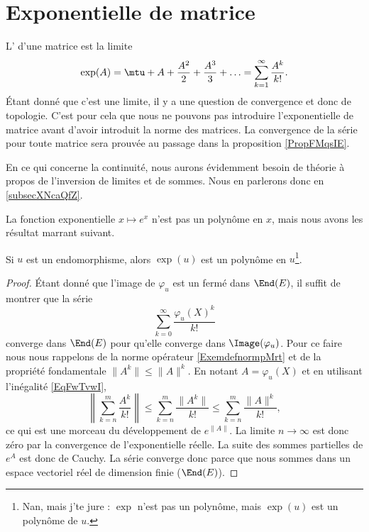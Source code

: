 \section{Exponentielle de matrice}
\label{secAOnIwQM}

L' d'une matrice est la limite
\begin{equation}
    \exp(A)=\mtu+A+\frac{ A^2 }{ 2 }+\frac{ A^3 }{ 3 }+\ldots =\sum_{k=1}^{\infty}\frac{ A^k }{ k! }.
\end{equation}
Étant donné que c'est une limite, il y a une question de convergence et donc de topologie. C'est pour cela que nous ne pouvons pas introduire l'exponentielle de matrice avant d'avoir introduit la norme des matrices. La convergence de la série pour toute matrice sera prouvée au passage dans la proposition \ref{PropFMqsIE}.

En ce qui concerne la continuité, nous aurons évidemment besoin de théorie à propos de l'inversion de limites et de sommes. Nous en parlerons donc en \ref{subsecXNcaQfZ}.

La fonction exponentielle \(  x\mapsto e^{x}\) n'est pas un polynôme en \( x\), mais nous avons les résultat marrant suivant.
\begin{proposition} \label{PropFMqsIE}
    Si \( u\) est un endomorphisme, alors \( \exp(u)\) est un polynôme en \( u\)\footnote{Nan, mais j'te jure : \( \exp\) n'est pas un polynôme, mais $\exp(u)$ est un polynôme de \( u\).}.
\end{proposition}

\begin{proof}
    Étant donné que l'image de \( \varphi_u\) est un fermé dans \( \End(E)\), il suffit de montrer que la série
    \begin{equation}
        \sum_{k=0}^{\infty}\frac{ \varphi_u(X)^k }{ k! }
    \end{equation}
    converge dans \( \End(E)\) pour qu'elle converge dans \( \Image(\varphi_u)\). Pour ce faire nous nous rappelons de la norme opérateur \eqref{ExemdefnormpMrt} et de la propriété fondamentale \( \| A^k \|\leq \| A \|^k\). En notant \( A=\varphi_u(X)\) et en utilisant l'inégalité \eqref{EqFwTvwI},
    \begin{equation}
        \left\| \sum_{k=n}^m\frac{ A^k }{ k! } \right\|\leq \sum_{k=n}^m\frac{ \| A^k \| }{ k! }\leq \sum_{k=n}^m\frac{ \| A \|^k }{ k! },
    \end{equation}
    ce qui est une morceau du développement de \(  e^{\| A \|}\). La limite \( n\to\infty\) est donc zéro par la convergence de l'exponentielle réelle. La suite des sommes partielles de  $e^{A}$ est donc de Cauchy. La série converge donc parce que nous sommes dans un espace vectoriel réel de dimension finie (\( \End(E)\)).
\end{proof}


